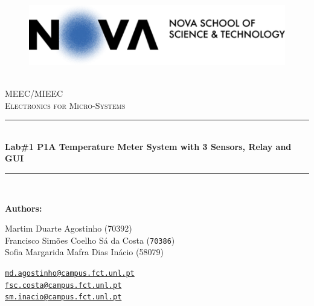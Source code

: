 \documentclass[12pt]{article}
\newcommand{\HRule}{\rule{\linewidth}{0.5mm}} %
\begin{document}
\begin{center}
    \begin{figure}
        \vspace{-1.0cm}
        \includegraphics[scale = 1, left]{NovaFct.png} %
    \end{figure}

    \mbox{}\\[2.0cm]
    \textsc{\Huge MEEC/MIEEC}\\[2.5cm]
    \textsc{\LARGE Electronics for Micro-Systems}\\[2.0cm]
    \HRule\\[0.4cm]
    {\large \bf { Lab\#1 P1\linebreak A Temperature Meter
    System with 3 Sensors,
    Relay and GUI
    }}\\[0.2cm] %
    \HRule\\[1.5cm]
\end{center}

\begin{flushleft}
    \textbf{Authors:}
\end{flushleft}

\begin{center}
    \begin{minipage}{0.5\textwidth}
        \begin{flushleft}
            Martim Duarte Agostinho (70392)\\
            Francisco Simões Coelho Sá da Costa   (\texttt{70386})\\
            Sofia Margarida Mafra Dias Inácio (58079)\\
        \end{flushleft}
    \end{minipage}%
    \begin{minipage}{0.5\textwidth}
        \begin{flushright}
            \href{mailto:md.agostinho@campus.fct.unl.pt}{\texttt{md.agostinho@campus.fct.unl.pt}}\\
            \href{mailto:fsc.costa@campus.fct.unl.pt}{\texttt{fsc.costa@campus.fct.unl.pt}}\\
            \href{mailto:sm.inacio@campus.fct.unl.pt}{\texttt{sm.inacio@campus.fct.unl.pt}}
        \end{flushright}
    \end{minipage}
\end{center}
 
\end{document}

